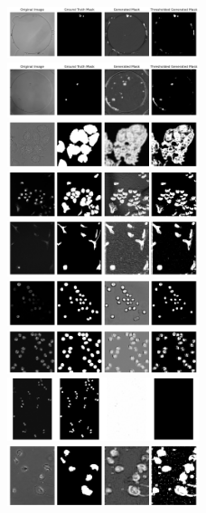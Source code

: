 \documentclass[./dissertation.tex]{subfiles}
\begin{document}
\begin{figure}
    \includegraphics[width=0.5\textwidth]{./figures/cc/BF-C2DL-HSC.png}
    \includegraphics[width=0.5\textwidth]{./figures/cc/BF-C2DL-MuSC.png}
    \includegraphics[width=0.5\textwidth]{./figures/cc/DIC-C2DH-HeLa.png}
    \includegraphics[width=0.5\textwidth]{./figures/cc/Fluo-C2DL-Huh7.png}
    \includegraphics[width=0.5\textwidth]{./figures/cc/Fluo-C2DL-MSC.png}
    \includegraphics[width=0.5\textwidth]{./figures/cc/Fluo-N2DH-GOWT1.png}
    \includegraphics[width=0.5\textwidth]{./figures/cc/Fluo-N2DH-SIM+.png}
    \includegraphics[width=0.5\textwidth]{./figures/cc/Fluo-N2DL-HeLa.png}
    \includegraphics[width=0.5\textwidth]{./figures/cc/PhC-C2DH-U373.png}

\end{figure}
\end{document}
